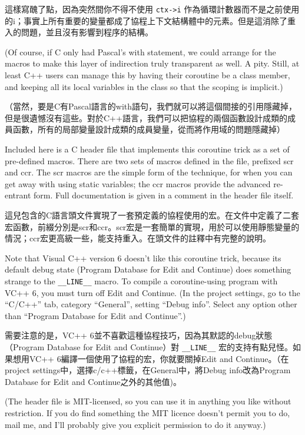 \documentclass[12pt]{article}
\begin{document}
\begin{CJK}{UTF8}{bsmi}
這樣寫醜了點，因為突然間你不得不使用 \verb+ctx->i+ 作為循環計數器而不是之前使用的i；事實上所有重要的變量都成了協程上下文結構體中的元素。但是這消除了重入的問題，並且沒有影響到程序的結構。 

(Of course, if C only had Pascal's with statement, we could arrange for the macros to make this layer of indirection truly transparent as well. A pity. Still, at least C++ users can manage this by having their coroutine be a class member, and keeping all its local variables in the class so that the scoping is implicit.)

（當然，要是C有Pascal語言的with語句，我們就可以將這個間接的引用隱藏掉，但是很遺憾沒有這些。對於C++語言，我們可以把協程的兩個函數設計成類的成員函數，所有的局部變量設計成類的成員變量，從而將作用域的問題隱藏掉） 

Included here is a C header file that implements this coroutine trick as a set of pre-defined macros. There are two sets of macros defined in the file, prefixed scr and ccr. The scr macros are the simple form of the technique, for when you can get away with using static variables; the ccr macros provide the advanced re-entrant form. Full documentation is given in a comment in the header file itself.

 這兒包含的C語言頭文件實現了一套預定義的協程使用的宏。在文件中定義了二套宏函數，前綴分別是scr和ccr。scr宏是一套簡單的實現，用於可以使用靜態變量的情況；ccr宏更高級一些，能支持重入。在頭文件的註釋中有完整的說明。 

Note that Visual C++ version 6 doesn't like this coroutine trick, because its default debug state (Program Database for Edit and Continue) does something strange to the
\verb+__LINE__+ macro. To compile a coroutine-using program with VC++ 6, you must turn off Edit and Continue. (In the project settings, go to the ``C/C++'' tab, category ``General'', setting ``Debug info''. Select any option other than ``Program Database for Edit and Continue''.)

 需要注意的是，VC++ 6並不喜歡這種協程技巧，因為其默認的debug狀態（Program Database for Edit and Continue）對 \verb+__LINE__+ 宏的支持有點兒怪。如果想用VC++ 6編譯一個使用了協程的宏，你就要關掉Edit and Continue。（在project settings中，選擇c/c++標籤，在General中，將Debug info改為Program Database for Edit and Continue之外的其他值)。 

(The header file is MIT-licensed, so you can use it in anything you like without restriction. If you do find something the MIT licence doesn't permit you to do, mail me, and I'll probably give you explicit permission to do it anyway.)


\end{CJK}
\end{document}
